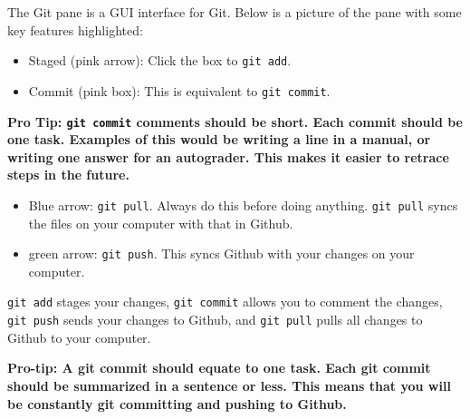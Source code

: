 \documentclass[
]{article}
\begin{document}
The Git pane is a GUI interface for Git. Below is a picture of the pane
with some key features highlighted:

\begin{center}
\end{center}

\begin{itemize}
\item
  Staged (pink arrow): Click the box to \texttt{git\ add}.
\item
  Commit (pink box): This is equivalent to \texttt{git\ commit}.
\end{itemize}

\textbf{Pro Tip: \texttt{git\ commit} comments should be short. Each
commit should be one task. Examples of this would be writing a line in a
manual, or writing one answer for an autograder. This makes it easier to
retrace steps in the future.}

\begin{itemize}
\item
  Blue arrow: \texttt{git\ pull}. Always do this before doing anything.
  \texttt{git\ pull} syncs the files on your computer with that in
  Github.
\item
  green arrow: \texttt{git\ push}. This syncs Github with your changes
  on your computer.
\end{itemize}

\texttt{git\ add} stages your changes, \texttt{git\ commit} allows you
to comment the changes, \texttt{git\ push} sends your changes to Github,
and \texttt{git\ pull} pulls all changes to Github to your computer.

\textbf{Pro-tip: A git commit should equate to one task. Each git commit
should be summarized in a sentence or less. This means that you will be
constantly git committing and pushing to Github.}
\end{document}

